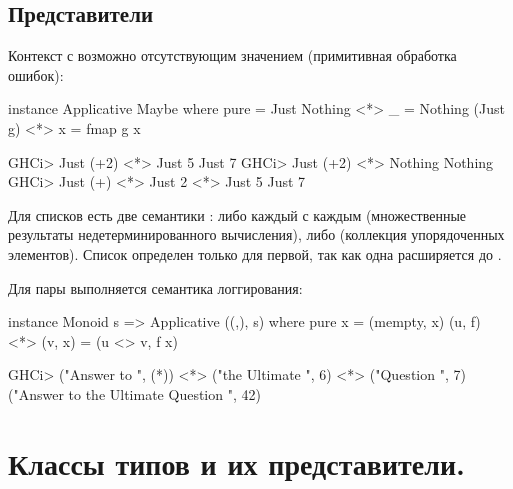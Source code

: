 \documentclass[11pt,a4paper]{article}
\begin{document}
\subsection{Представители}
Контекст с возможно отсутствующим значением (примитивная обработка ошибок):
\begin{hscode}
instance Applicative Maybe where
  pure = Just
  Nothing <*> _ = Nothing
  (Just g) <*> x = fmap g x

GHCi> Just (+2) <*> Just 5
Just 7
GHCi> Just (+2) <*> Nothing
Nothing
GHCi> Just (+) <*> Just 2 <*> Just 5
Just 7
\end{hscode}
Для списков есть две семантики : либо каждый с каждым (множественные результаты недетерминированного вычисления), либо  (коллекция упорядоченных элементов).
Список определен только для первой, так как одна расширяется до .
Для пары выполняется семантика логгирования:
\begin{hscode}
instance Monoid s => Applicative ((,), s) where
  pure x = (mempty, x)
  (u, f) <*> (v, x) = (u <> v, f x)

GHCi> ("Answer to ", (*)) <*> ("the Ultimate ", 6) <*> ("Question ", 7)
("Answer to the Ultimate Question ", 42)
\end{hscode}


\section{Классы типов  и их представители.}
\end{document}
